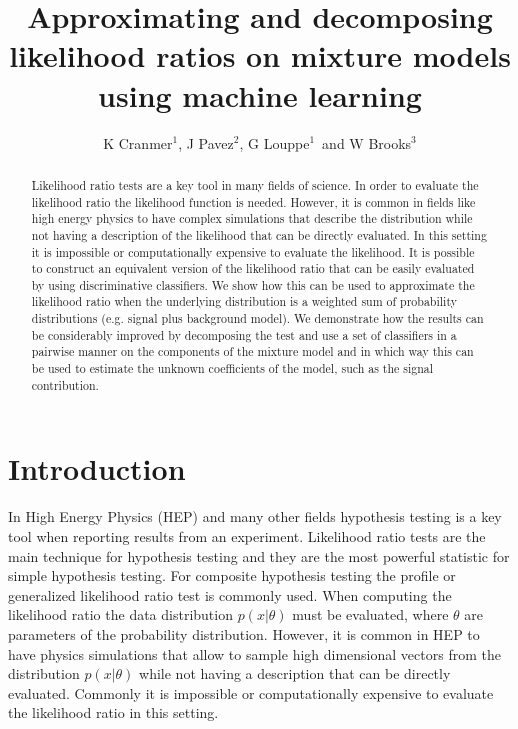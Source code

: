 \documentclass[a4paper]{jpconf}
\begin{document}
\title{Approximating and decomposing likelihood ratios on mixture models using machine learning}

\author{K Cranmer$^1$, J Pavez$^2$,
G Louppe$^1$\ and  W Brooks$^3$}

\address{$^1$ Physics Department, New York University, New York, NY 10003, U.S.A.}
\address{$^2$ Informatics Department, Universidad T\'ecnica Federico Santa Mar\'ia, 1240 Av. Espa\~na, Valpara\'iso, Chile}
\address{$^3$ Physics Department, Universidad T\'ecnica Federico Santa Mar\'ia, 1240 Av. Espa\~na, Valpara\'iso, Chile}



\begin{abstract}
Likelihood ratio tests are a key tool in many fields of science. In order to evaluate the likelihood ratio the likelihood function is needed. However, it is common in fields like high energy physics to have complex simulations that describe the distribution while not having a description of the likelihood that can be directly evaluated. In this setting it is impossible or computationally expensive to evaluate the likelihood. It is possible to construct an equivalent version of the likelihood ratio that can be easily evaluated by using discriminative classifiers. We show how this can be used to approximate the likelihood ratio when the underlying distribution is a weighted sum of probability distributions (e.g. signal plus background model). We demonstrate how the results can be considerably improved by decomposing the test and use a set of classifiers in a pairwise manner on the components of the mixture model and in which way this can be used to estimate the unknown coefficients of the model, such as the signal contribution.
\end{abstract}
\section{Introduction}

In High Energy Physics (HEP) and many other fields hypothesis testing is a key tool when reporting results from an experiment. Likelihood ratio tests are 
the main technique for hypothesis testing and they are the most powerful statistic for simple hypothesis testing. For composite hypothesis 
testing the profile or generalized likelihood ratio test is commonly used. When computing the likelihood ratio the data distribution $p(x|\theta)$ must 
be evaluated, where $\theta$ are parameters of the probability distribution. However, it is common in HEP to have physics simulations that allow to sample high dimensional vectors from the distribution $p(x|\theta)$ while not having a description that can be directly evaluated. Commonly it is impossible or computationally expensive to evaluate the likelihood ratio in this setting. %
\end{document}
